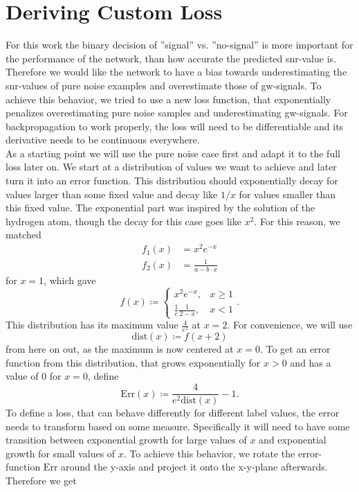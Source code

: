 \section{Deriving Custom Loss}\label{app:custom_loss}
For this work the binary decision of ''signal'' vs. ''no-signal'' is more important for the performance of the network, than how accurate the predicted \gls{snr}-value is. Therefore we would like the network to have a bias towards underestimating the \gls{snr}-values of pure noise examples and overestimate those of \gls{gw}-signals. To achieve this behavior, we tried to use a new loss function, that exponentially penalizes overestimating pure noise samples and underestimating \gls{gw}-signals. For backpropagation to work properly, the loss will need to be differentiable and its derivative needs to be continuous everywhere.\\
As a starting point we will use the pure noise case first and adapt it to the full loss later on. We start at a distribution of values we want to achieve and later turn it into an error function. This distribution should exponentially decay for values larger than some fixed value and decay like $1/x$ for values smaller than this fixed value. The exponential part was inspired by the solution of the hydrogen atom, though the decay for this case goes like $x^2$. For this reason, we matched
\begin{align}
f_1(x) & = x^2 e^{-x}\\
f_2(x) & = \frac{1}{a-b\cdot x}
\end{align}
for $x=1$, which gave
\begin{equation}
f(x)\coloneqq
\begin{cases}
	x^2 e^{-x}, & x \geq 1\\
	\frac{1}{e}\frac{1}{2-x}, & x < 1
\end{cases}.
\end{equation}
This distribution has its maximum value $\frac{4}{e^2}$ at $x=2$. For convenience, we will use
\begin{equation}
\text{dist}(x)\coloneqq f(x+2)
\end{equation}
from here on out, as the maximum is now centered at $x=0$. To get an error function from this distribution, that grows exponentially for $x>0$ and has a value of $0$ for $x=0$, define
\begin{equation}
\text{Err}(x)\coloneqq \frac{4}{e^2 \text{dist}(x)} - 1.
\end{equation}
To define a loss, that can behave differently for different label values, the error needs to transform based on some measure. Specifically it will need to have some transition between exponential growth for large values of $x$ and exponential growth for small values of $x$. To achieve this behavior, we rotate the error-function $\text{Err}$ around the y-axis and project it onto the x-y-plane afterwards. Therefore we get
